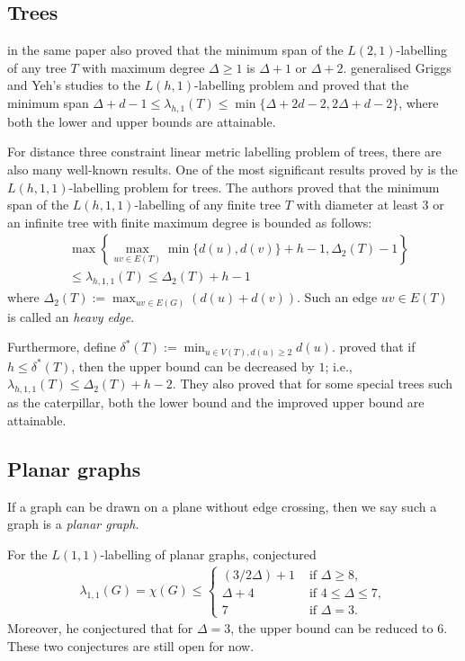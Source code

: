 \subsection{Trees}

\citet{griggs92} in the same paper also proved that the minimum span of the $L(2,1)$-labelling of any tree $T$ with maximum degree $\Delta \ge 1$ is $\Delta+1$ or $\Delta+2$. \cite{chang00} generalised Griggs and Yeh's studies to the $L(h,1)$-labelling problem and proved that the minimum span $\Delta+d-1 \le \lambda_{h, 1}(T) \le \min\{\Delta+2d-2, 2\Delta+d-2\}$, where both the lower and upper bounds are attainable. 

For distance three constraint linear metric labelling problem  of trees, there are also many well-known results. One of the most significant results proved by \cite{zhou10} is the $L(h,1,1)$-labelling problem for trees. The authors proved that the minimum span of the $L(h,1,1)$-labelling of any finite tree $T$ with diameter at least $3$ or an infinite tree with finite maximum degree is bounded as follows: 
\begin{align*}
&\max \left\{\max_{uv \in E(T)} \min \{d(u), d(v)\} +h-1, \Delta_2(T) -1\right\} \\
&\le \lambda_{h,1,1}(T) \le \Delta_2(T) +h-1 
\end{align*}
where $\Delta_2(T) := \max_{uv \in E(G)} (d(u) + d(v))$. Such an edge $uv \in E(T)$ is called an \emph{heavy edge}.  

Furthermore, define $\delta^*(T) := \min_{u \in V(T), d(u) \ge 2} d(u)$. \citeauthor{zhou10} proved that if $h \le \delta^*(T)$, then the upper bound can be decreased by $1$; i.e., $\lambda_{h,1,1}(T) \le \Delta_2(T) +h-2$. They also proved that for some special trees such as the caterpillar, both the lower bound and the improved upper bound are attainable. 


 
 

\subsection{Planar graphs}
If a graph can be drawn on a plane without edge crossing, then we say such a graph is a \emph{planar graph}. 

For the $L(1,1)$-labelling of planar graphs, \cite{wegner97} conjectured
\begin{align*}
\lambda_{1,1}(G) = \chi(G) \le 
\begin{cases}
(3/2\Delta) + 1 & \text{ if } \Delta \ge 8, \\
\Delta+4 & \text{ if } 4 \le \Delta \le 7, \\
7 & \text{ if } \Delta = 3.
\end{cases} 
\end{align*}
Moreover, he conjectured that for $\Delta = 3$, the upper bound can be reduced to $6$. These two conjectures are still open for now. 

